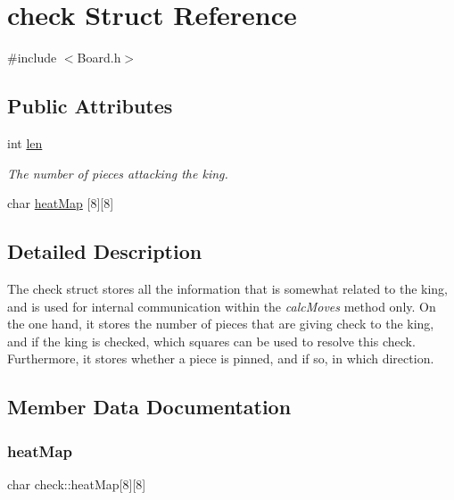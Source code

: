 \hypertarget{structcheck}{}\section{check Struct Reference}
\label{structcheck}


{\ttfamily \#include $<$Board.\+h$>$}

\subsection*{Public Attributes}
\begin{DoxyCompactItemize}
\item 
\mbox{\label{structcheck_a004e9a83f3635e9ec1e40c98d3ba0519}} 
int \hyperlink{structcheck_a004e9a83f3635e9ec1e40c98d3ba0519}{len}
\begin{DoxyCompactList}\small\item\em The number of pieces attacking the king. \end{DoxyCompactList}\item 
char \hyperlink{structcheck_a20edc7f43122fbfd399629ed8b41dc6a}{heat\+Map} \mbox{[}8\mbox{]}\mbox{[}8\mbox{]}
\end{DoxyCompactItemize}


\subsection{Detailed Description}
The check struct stores all the information that is somewhat related to the king, and is used for internal communication within the {\itshape calc\+Moves} method only. On the one hand, it stores the number of pieces that are giving check to the king, and if the king is checked, which squares can be used to resolve this check. Furthermore, it stores whether a piece is pinned, and if so, in which direction. 

\subsection{Member Data Documentation}
\mbox{\label{structcheck_a20edc7f43122fbfd399629ed8b41dc6a}} 
\subsubsection{\texorpdfstring{heat\+Map}{heatMap}}
{\footnotesize\ttfamily char check\+::heat\+Map\mbox{[}8\mbox{]}\mbox{[}8\mbox{]}}

